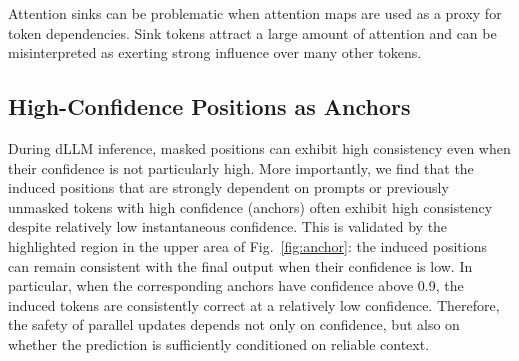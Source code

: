 Attention sinks can be problematic when attention maps are used as a proxy for token dependencies. Sink tokens attract a large amount of attention and can be misinterpreted as exerting strong influence over many other tokens. 

\subsection{High-Confidence Positions as Anchors} \label{obs: anchors}

During dLLM inference, masked positions can exhibit high consistency even when their confidence is not particularly high. More importantly, we find that the induced positions that are strongly dependent on prompts or previously unmasked tokens with high confidence (anchors) often exhibit high consistency despite relatively low instantaneous confidence. This is validated by the highlighted region in the upper area of Fig.~\ref{fig:anchor}: the induced positions can remain consistent with the final output when their confidence is low. In particular, when the corresponding anchors have confidence above 0.9, the induced tokens are consistently correct at a relatively low confidence. Therefore, the safety of parallel updates depends not only on confidence, but also on whether the prediction is sufficiently conditioned on reliable context. 



